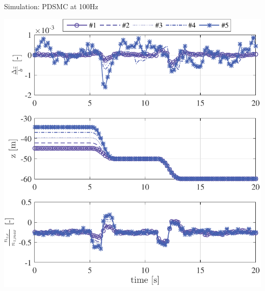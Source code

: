 \documentclass[12pt,svgnames,table,draft=false]{beamer}
\begin{document}

\begin{frame}{Simulation: PDSMC at 100Hz}
\begin{center}
\includegraphics[height=.6\paperwidth]{PDSMC-100Hz-TIMESCALESEPARATION-turbulence=1}    %

\end{center}\end{frame}
\end{document}
